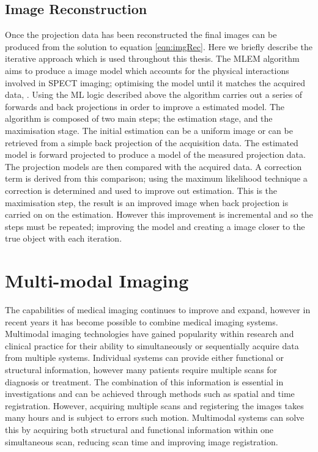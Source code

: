 \subsection{Image Reconstruction}
Once the projection data has been reconstructed the final images can be produced from the solution to equation \ref{eqn:imgRec}. Here we briefly describe the iterative approach which is used throughout this thesis. The \acrlong{MLEM} algorithm aims to produce a image model which accounts for the physical interactions involved in \acrshort{SPECT} imaging; optimising the model until it matches the acquired data, \cite{4307558}. Using the \acrshort{ML} logic described above the algorithm carries out a series of forwards and back projections in order to improve a estimated model. The algorithm is composed of two main steps; the estimation stage, and the maximisation stage. The initial estimation can be a uniform image or can be retrieved from a simple back projection of the acquisition data. The estimated model is forward projected to produce a model of the measured projection data. The projection models are then compared with the acquired data. A correction term is derived from this comparison; using the maximum likelihood technique a correction is determined and used to improve out estimation. This is the maximisation step, the result is an improved image when back projection is carried on on the estimation. However this improvement is incremental and so the steps must be repeated; improving the model and creating a image closer to the true object with each iteration.  

\section{Multi-modal Imaging} %
The capabilities of medical imaging continues to improve and expand, however in recent years it has become possible to combine medical imaging systems. Multimodal imaging technologies have gained popularity within research and clinical practice for their ability to simultaneously or sequentially acquire data from multiple systems. Individual systems can provide either functional or structural information, however many patients require multiple scans for diagnosis or treatment. The combination of this information is essential in investigations and can be achieved through methods such as spatial and time registration. However, acquiring multiple scans and registering the images takes many hours and is subject to errors such motion. Multimodal systems can solve this by acquiring both structural and functional information within one simultaneous scan, reducing scan time and improving image registration. 

